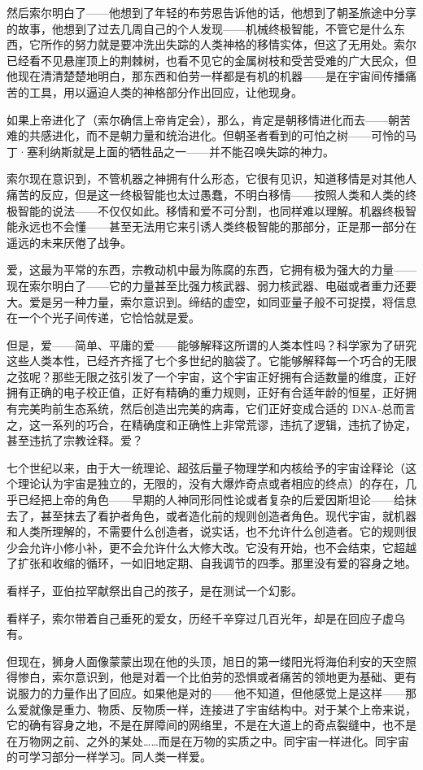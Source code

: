 \documentclass[AutoFakeBold=true]{book}
\begin{document}
然后索尔明白了——他想到了年轻的布劳恩告诉他的话，他想到了朝圣旅途中分享的故事，他想到了过去几周自己的个人发现——机械终极智能，不管它是什么东西，它所作的努力就是要冲洗出失踪的人类神格的移情实体，但这了无用处。索尔已经看不见悬崖顶上的荆棘树，也看不见它的金属树枝和受苦受难的广大民众，但他现在清清楚楚地明白，那东西和伯劳一样都是有机的机器——是在宇宙间传播痛苦的工具，用以逼迫人类的神格部分作出回应，让他现身。

如果上帝进化了（索尔确信上帝肯定会），那么，肯定是朝移情进化而去——朝苦难的共感进化，而不是朝力量和统治进化。但朝圣者看到的可怕之树——可怜的马丁·塞利纳斯就是上面的牺牲品之一——并不能召唤失踪的神力。

索尔现在意识到，不管机器之神拥有什么形态，它很有见识，知道移情是对其他人痛苦的反应，但是这一终极智能也太过愚蠢，不明白移情——按照人类和人类的终极智能的说法——不仅仅如此。移情和爱不可分割，也同样难以理解。机器终极智能永远也不会懂——甚至无法用它来引诱人类终极智能的那部分，正是那一部分在遥远的未来厌倦了战争。

爱，这最为平常的东西，宗教动机中最为陈腐的东西，它拥有极为强大的力量——现在索尔明白了——它的力量甚至比强力核武器、弱力核武器、电磁或者重力还要大。爱是另一种力量，索尔意识到。缔结的虚空，如同亚量子般不可捉摸，将信息在一个个光子间传递，它恰恰就是爱。

但是，爱——简单、平庸的爱——能够解释这所谓的人类本性吗？科学家为了研究这些人类本性，已经齐齐摇了七个多世纪的脑袋了。它能够解释每一个巧合的无限之弦呢？那些无限之弦引发了一个宇宙，这个宇宙正好拥有合适数量的维度，正好拥有正确的电子校正值，正好有精确的重力规则，正好有合适年龄的恒星，正好拥有完美昀前生态系统，然后创造出完美的病毒，它们正好变成合适的 DNA-总而言之，这一系列的巧合，在精确度和正确性上非常荒谬，违抗了逻辑，违抗了协定，甚至违抗了宗教诠释。爱？

七个世纪以来，由于大一统理论、超弦后量子物理学和内核给予的宇宙诠释论（这个理论认为宇宙是独立的，无限的，没有大爆炸奇点或者相应的终点）的存在，几乎已经把上帝的角色——早期的人神同形同性论或者复杂的后爱因斯坦论——给抹去了，甚至抹去了看护者角色，或者造化前的规则创造者角色。现代宇宙，就机器和人类所理解的，不需要什么创造者，说实话，也不允许什么创造者。它的规则很少会允许小修小补，更不会允许什么大修大改。它没有开始，也不会结束，它超越了扩张和收缩的循环，一如旧地定期、自我调节的四季。那里没有爱的容身之地。

看样子，亚伯拉罕献祭出自己的孩子，是在测试一个幻影。

看样子，索尔带着自己垂死的爱女，历经千辛穿过几百光年，却是在回应子虚乌有。

但现在，狮身人面像蒙蒙出现在他的头顶，旭日的第一缕阳光将海伯利安的天空照得惨白，索尔意识到，他是对着一个比伯劳的恐惧或者痛苦的领地更为基础、更有说服力的力量作出了回应。如果他是对的——他不知道，但他感觉上是这样——那么爱就像是重力、物质、反物质一样，连接进了宇宙结构中。对于某个上帝来说，它的确有容身之地，不是在屏障间的网络里，不是在大道上的奇点裂缝中，也不是在万物网之前、之外的某处……而是在万物的实质之中。同宇宙一样进化。同宇宙的可学习部分一样学习。同人类一样爱。
\end{document}
